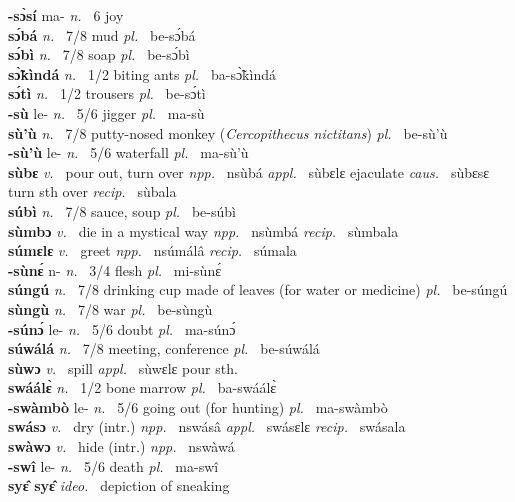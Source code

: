 {\bfseries -sɔ̀sí} ma- {\itshape n.~} 6 joy    \\ 
{\bfseries sɔ́bá}  {\itshape n.~} 7/8 mud {\itshape pl.~} be-sɔ́bá    \\ 
{\bfseries sɔ́bì}  {\itshape n.~} 7/8 soap {\itshape pl.~} be-sɔ́bì    \\ 
{\bfseries sɔ̃̀kìndá}  {\itshape n.~} 1/2 biting ants {\itshape pl.~} ba-sɔ̃̀kìndá    \\ 
{\bfseries sɔ́tì}  {\itshape n.~} 1/2 trousers {\itshape pl.~} be-sɔ́tì    \\ 
{\bfseries -sù} le- {\itshape n.~} 5/6 jigger {\itshape pl.~} ma-sù    \\ 
{\bfseries sù'ù}  {\itshape n.~} 7/8 putty-nosed monkey ({\itshape Cercopithecus nictitans}) {\itshape pl.~} be-sù'ù    \\ 
{\bfseries -sù'ù} le- {\itshape n.~} 5/6 waterfall {\itshape pl.~} ma-sù'ù    \\ 
{\bfseries sùbɛ}  {\itshape v.~} pour out, turn over   {\itshape npp.~} nsùbá {\itshape appl.~} sùbɛlɛ ejaculate {\itshape caus.~} sùbɛsɛ turn sth over {\itshape recip.~} sùbala  \\ 
{\bfseries súbì}  {\itshape n.~} 7/8 sauce, soup {\itshape pl.~} be-súbì    \\ 
{\bfseries sùmbɔ}  {\itshape v.~} die in a mystical way   {\itshape npp.~} nsùmbá {\itshape recip.~} sùmbala  \\ 
{\bfseries súmɛlɛ}  {\itshape v.~} greet   {\itshape npp.~} nsúmálâ {\itshape recip.~} súmala  \\ 
{\bfseries -sùnɛ́} n- {\itshape n.~} 3/4 flesh {\itshape pl.~} mi-sùnɛ́    \\ 
{\bfseries súngú}  {\itshape n.~} 7/8 drinking cup made of leaves (for water or medicine) {\itshape pl.~} be-súngú    \\ 
{\bfseries sùngù}  {\itshape n.~} 7/8 war  {\itshape pl.~} be-sùngù    \\ 
{\bfseries -súnɔ́} le- {\itshape n.~} 5/6 doubt {\itshape pl.~} ma-súnɔ́   \\ 
{\bfseries súwálá}  {\itshape n.~} 7/8 meeting, conference {\itshape pl.~} be-súwálá    \\ 
{\bfseries sùwɔ}  {\itshape v.~} spill   {\itshape appl.~} sùwɛlɛ pour sth.  \\ 
{\bfseries swáálɛ̀}  {\itshape n.~} 1/2 bone marrow {\itshape pl.~} ba-swáálɛ̀    \\ 
{\bfseries -swàmbò} le- {\itshape n.~} 5/6 going out (for hunting) {\itshape pl.~} ma-swàmbò    \\ 
{\bfseries swásɔ}  {\itshape v.~} dry (intr.)   {\itshape npp.~} nswásâ {\itshape appl.~} swásɛlɛ {\itshape recip.~} swásala  \\ 
{\bfseries swàwɔ}  {\itshape v.~} hide (intr.)   {\itshape npp.~} nswàwá  \\ 
{\bfseries -swî} le- {\itshape n.~} 5/6 death {\itshape pl.~} ma-swî    \\ 
{\bfseries syɛ̂ syɛ̂}  {\itshape ideo.~} depiction of sneaking    \\ 

